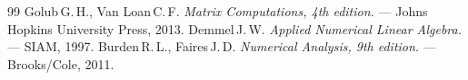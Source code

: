 \begin{thebibliography}{99}
Golub\,G.\,H., Van Loan\,C.\,F.
{\itshape Matrix Computations, 4th edition.} --- Johns Hopkins University Press, 2013.
Demmel\,J.\,W.
{\itshape Applied Numerical Linear Algebra.} --- SIAM, 1997.
Burden\,R.\,L., Faires\,J.\,D.
{\itshape Numerical Analysis, 9th edition.} --- Brooks/Cole, 2011.
\end{thebibliography}
